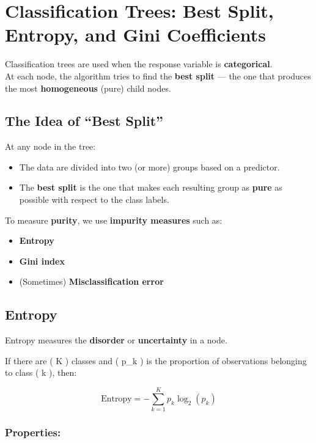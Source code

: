 \documentclass[
  letterpaper,
  DIV=11,
  numbers=noendperiod]{scrreprt}
\providecommand{\tightlist}{%
  \setlength{\itemsep}{0pt}\setlength{\parskip}{0pt}}\usepackage{longtable,booktabs,array}
\begin{document}
\section{Classification Trees: Best Split, Entropy, and Gini
Coefficients}\label{classification-trees-best-split-entropy-and-gini-coefficients}

Classification trees are used when the response variable is
\textbf{categorical}.\\
At each node, the algorithm tries to find the \textbf{best split} ---
the one that produces the most \textbf{homogeneous} (pure) child nodes.

\subsection{The Idea of ``Best Split''}\label{the-idea-of-best-split}

At any node in the tree:

\begin{itemize}
\tightlist
\item
  The data are divided into two (or more) groups based on a predictor.
\item
  The \textbf{best split} is the one that makes each resulting group as
  \textbf{pure} as possible with respect to the class labels.
\end{itemize}

To measure \textbf{purity}, we use \textbf{impurity measures} such as:

\begin{itemize}
\item
  \textbf{Entropy}
\item
  \textbf{Gini index}
\item
  (Sometimes) \textbf{Misclassification error}
\end{itemize}

\subsection{Entropy}\label{entropy}

Entropy measures the \textbf{disorder} or \textbf{uncertainty} in a
node.

If there are ( K ) classes and ( p\_k ) is the proportion of
observations belonging to class ( k ), then:

\[
\text{Entropy} = - \sum_{k=1}^{K} p_k \log_2(p_k)
\]

\subsubsection{Properties:}\label{properties}
\end{document}

